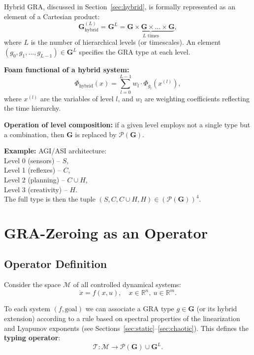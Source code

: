 \documentclass[12pt,a4paper]{article}
\newcommand{\R}{\mathbb{R}}
\newcommand{\G}{\mathbf{G}}
\newcommand{\M}{\mathcal{M}}
\newcommand{\T}{\mathcal{T}}
\newcommand{\Pset}{\mathcal{P}}
\begin{document}
Hybrid GRA, discussed in Section~\ref{sec:hybrid}, is formally represented as an element of a Cartesian product:
\begin{equation}
    \G_{\text{hybrid}}^{(L)} = \G^L = \underbrace{\G \times \G \times \dots \times \G}_{L \text{ times}},
\end{equation}
where $L$ is the number of hierarchical levels (or timescales). An element $(g_0, g_1, \dots, g_{L-1}) \in \G^L$ specifies the GRA type at each level.

\textbf{Foam functional of a hybrid system:}
\begin{equation}
    \Phi_{\text{hybrid}}(x) = \sum_{l=0}^{L-1} w_l \cdot \Phi_{g_l}(x^{(l)}),
\end{equation}
where $x^{(l)}$ are the variables of level $l$, and $w_l$ are weighting coefficients reflecting the time hierarchy.

\textbf{Operation of level composition:} if a given level employs not a single type but a combination, then $\G$ is replaced by $\Pset(\G)$.

\textbf{Example:} AGI/ASI architecture: \\
Level 0 (sensors) – $S$, \\
Level 1 (reflexes) – $C$, \\
Level 2 (planning) – $C \cup H$, \\
Level 3 (creativity) – $H$. \\
The full type is then the tuple $(S, C, C \cup H, H) \in (\Pset(\G))^4$.

\section{GRA-Zeroing as an Operator}
\label{sec:operator}

\subsection{Operator Definition}

Consider the space $\M$ of all controlled dynamical systems:
\begin{equation}
    \dot{x} = f(x, u), \quad x \in \R^n,\ u \in \R^m.
\end{equation}

To each system $(f, \text{goal})$ we can associate a GRA type $g \in \G$ (or its hybrid extension) according to a rule based on spectral properties of the linearization and Lyapunov exponents (see Sections~\ref{sec:static}--\ref{sec:chaotic}). This defines the \textbf{typing operator}:
\begin{equation}
    \T : \M \to \Pset(\G) \cup \G^L.
\end{equation}
\end{document}
